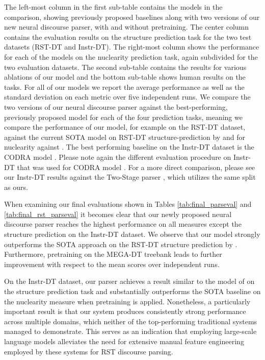\documentclass[11pt]{article}
\begin{document}
The left-most column in the first sub-table contains the models in the comparison, showing previously proposed baselines along with two versions of our new neural discourse parser, with and without pretraining. The center column contains the evaluation results on the structure prediction task for the two test datasets (RST-DT and Instr-DT). The right-most column shows the performance for each of the models on the nuclearity prediction task, again subdivided for the two evaluation datasets. The second sub-table contains the results for various ablations of our model and the bottom sub-table shows human results on the tasks. For all of our models we report the average performance as well as the standard deviation on each metric over five independent runs. We compare the two versions of our neural discourse parser against the best-performing, previously proposed model for each of the four prediction tasks, meaning we compare the performance of our model, for example on the RST-DT dataset, against the current SOTA model on RST-DT structure-prediction by  and for nuclearity against . The best performing baseline on the Instr-DT dataset is the CODRA model \cite{joty2015codra}. Please note again the different evaluation procedure on Instr-DT that was used for CODRA model \cite{joty2015codra}. For a more direct comparison, please see our Instr-DT results against the Two-Stage parser \cite{wang-etal-2017-two}, which utilizes the same split as ours.  

When examining our final evaluations shown in Tables \ref{tab:final_parseval} and \ref{tab:final_rst_parseval} it becomes clear that our newly proposed neural discourse parser reaches the highest performance on all measures except the structure prediction on the Instr-DT dataset. 
We observe that our model strongly outperforms the SOTA approach on the RST-DT structure prediction by . Furthermore, pretraining on the MEGA-DT treebank leads to further improvement with respect to the mean scores over independent runs. 

On the Instr-DT dataset, our parser achieves a result similar to the model of  on the structure prediction task and substantially outperforms the SOTA baseline on the nuclearity measure when pretraining is applied. 
Nonetheless, a particularly important result is that our system produces consistently strong performance across multiple domains, which neither of the top-performing traditional systems \cite{wang-etal-2017-two,joty2015codra} managed to demonstrate. This serves as an indication that employing large-scale language models alleviates the need for extensive manual feature engineering employed by these systems for RST discourse parsing.
\end{document}
